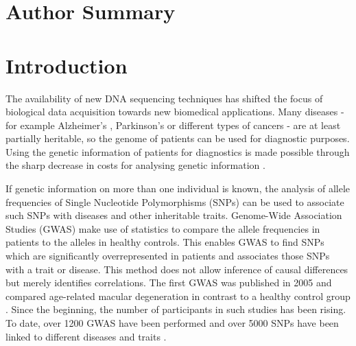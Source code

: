 \documentclass[10pt]{article}
\begin{document}
\section*{Author Summary}

\section*{Introduction}

The availability of new DNA sequencing techniques has shifted the focus of biological data acquisition towards new biomedical applications.
Many diseases - for example Alzheimer's \cite{alzheimer}, Parkinson's \cite{parkinsons} or different types of cancers \cite{breastcancer,prostatecancer} - are at least partially heritable, so the genome of patients can be used for diagnostic purposes. Using the genetic information of patients for diagnostics is made possible through the sharp decrease in costs for analysing genetic information \cite{Brown1999}. 



If genetic information on more than one individual is known, the analysis of
allele frequencies of Single Nucleotide Polymorphisms (SNPs) can be used to associate such SNPs with diseases and other inheritable traits. Genome-Wide Association Studies
(GWAS) make use of statistics to compare the allele frequencies in patients to the alleles in healthy controls. This
enables GWAS to find SNPs which are significantly overrepresented in patients and associates those SNPs with a trait or disease.
This method does not allow inference of causal differences but merely identifies correlations. 
The first GWAS was published in 2005 and compared age-related macular degeneration in contrast 
to a healthy control group \cite{Klein2005}. Since the beginning, the number of participants in 
such studies has been rising. To date, over 1200 GWAS have been performed \cite{Johnson2009} and over 
5000 SNPs have been linked to different diseases and traits \cite{Hindorff2009}.   
\end{document}
